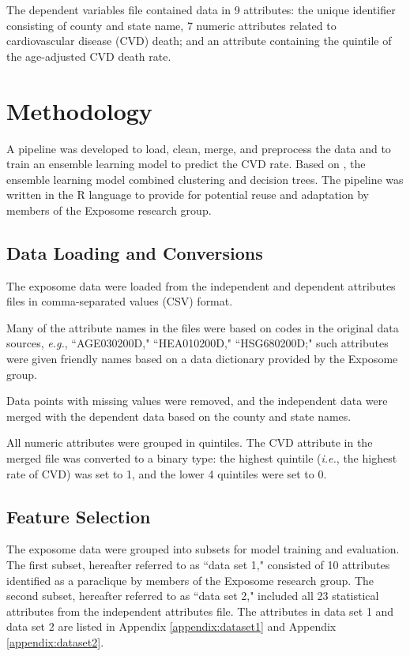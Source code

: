\documentclass[conference,compsoc]{IEEEtran}
\begin{document}
The dependent variables file contained data in 9 attributes: the unique identifier consisting of county and state name, 7 numeric attributes related to cardiovascular
disease (CVD) death; and an attribute containing the quintile of the age-adjusted CVD death rate.

\section{Methodology}

A pipeline was developed to load, clean, merge, and preprocess the data and to train an ensemble learning model to predict the
CVD rate. Based on \cite{datta}, the ensemble learning model combined clustering and decision trees. The pipeline was written
in the R language to provide for potential reuse and adaptation by members of the Exposome research group.

\subsection{Data Loading and Conversions}

The exposome data were loaded from the independent and dependent attributes files in comma-separated values (CSV) format.

Many of the attribute names in the files were based on codes in the original data sources, \textit{e.g.}, ``AGE030200D," ``HEA010200D," ``HSG680200D;"
such attributes were given friendly names based on a data dictionary provided by the Exposome group.

Data points with missing values were removed, and the independent data were merged with the dependent data based on the county and state names.

All numeric attributes were grouped in quintiles. The CVD attribute in the merged file was converted to a binary type: 
the highest quintile (\textit{i.e.}, the highest rate of CVD) was set to 1, and the lower 4 quintiles were set to 0.

\subsection{Feature Selection}

The exposome data were grouped into subsets for model training and evaluation. The first subset, hereafter referred to as ``data set 1,"
consisted of 10 attributes identified as a paraclique by members of the Exposome research group. The second subset, hereafter referred to as ``data set 2,"
included all 23 statistical attributes from the independent attributes file. The attributes in data set 1 and data set 2 are listed in Appendix \ref{appendix:dataset1} and Appendix \ref{appendix:dataset2}.
\end{document}
